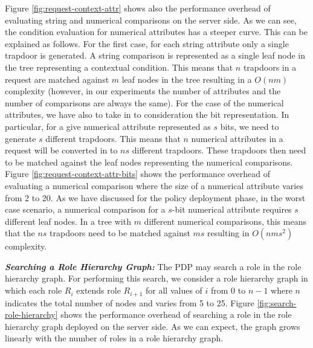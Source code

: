 \documentclass[final,5p,times,twocolumn]{elsarticle}
\begin{document}
Figure \ref{fig:request-context-attr} shows also the performance overhead of evaluating string and numerical comparisons on the server side. As we can see, the condition evaluation for numerical attributes has a steeper curve. This can be explained as follows. For the first case, for each string attribute only a single trapdoor is generated. A string comparison is represented as a single leaf node in the tree representing a contextual condition. This means that $n$ trapdoors in a request are matched against $m$ leaf nodes in the tree resulting in a $O(nm)$ complexity (however, in our experiments the number of attributes and the number of comparisons are always the same). For the case of the numerical attributes, we have also to take in to consideration the bit representation. In particular, for a give numerical attribute represented as $s$ bits, we need to generate $s$ different trapdoors. This means that $n$ numerical attributes in a request will be converted in to $n s$ different trapdoors. These trapdoors then need to be matched against the leaf nodes representing the numerical comparisons. Figure \ref{fig:request-context-attr-bits} shows the performance overhead of evaluating a numerical comparison where the size of a numerical attribute varies from 2 to 20. As we have discussed for the policy deployment phase, in the worst case scenario, a numerical comparison for a $s$-bit numerical attribute requires $s$ different leaf nodes. In a tree with $m$ different numerical comparisons, this means that the $n s$ trapdoors need to be matched against $m s$ resulting in $O(n m s^2)$ complexity.


\emph{\textbf{Searching a Role Hierarchy Graph:}}
The PDP may search a role in the role hierarchy graph. For performing this search, we consider a role hierarchy graph in which each role $R_i$ extends role $R_{i+1}$ for all values of $i$ from 0 to $n - 1$ where $n$ indicates the total number of nodes and varies from 5 to 25. Figure \ref{fig:search-role-hierarchy} shows the performance overhead of searching a role in the role hierarchy graph deployed on the server side. As we can expect, the graph grows linearly with the number of roles in a role hierarchy graph.
\end{document}
